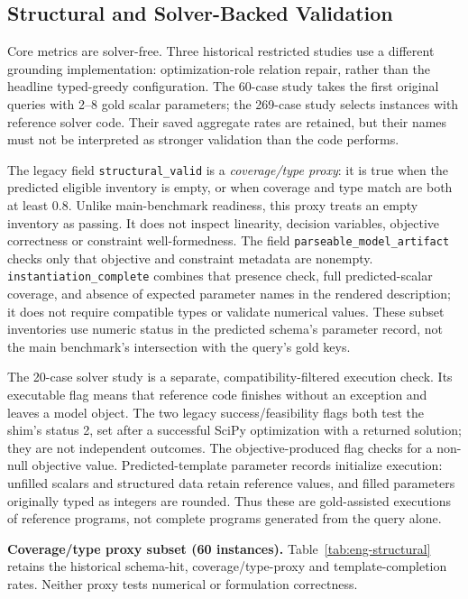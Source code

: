 \subsection{Structural and Solver-Backed Validation}
\label{app:restricted-details}

Core metrics are solver-free. Three historical restricted studies use a different grounding implementation: optimization-role relation repair, rather than the headline typed-greedy configuration. The 60-case study takes the first original queries with 2--8 gold scalar parameters; the 269-case study selects instances with reference solver code. Their saved aggregate rates are retained, but their names must not be interpreted as stronger validation than the code performs.

The legacy field \texttt{structural\_valid} is a \emph{coverage/type proxy}: it is true when the predicted eligible inventory is empty, or when coverage and type match are both at least 0.8. Unlike main-benchmark readiness, this proxy treats an empty inventory as passing. It does not inspect linearity, decision variables, objective correctness or constraint well-formedness. The field \texttt{parseable\_model\_artifact} checks only that objective and constraint metadata are nonempty. \texttt{instantiation\_complete} combines that presence check, full predicted-scalar coverage, and absence of expected parameter names in the rendered description; it does not require compatible types or validate numerical values. These subset inventories use numeric status in the predicted schema's parameter record, not the main benchmark's intersection with the query's gold keys.

The 20-case solver study is a separate, compatibility-filtered execution check. Its executable flag means that reference code finishes without an exception and leaves a model object. The two legacy success/feasibility flags both test the shim's status 2, set after a successful SciPy optimization with a returned solution; they are not independent outcomes. The objective-produced flag checks for a non-null objective value. Predicted-template parameter records initialize execution: unfilled scalars and structured data retain reference values, and filled parameters originally typed as integers are rounded. Thus these are gold-assisted executions of reference programs, not complete programs generated from the query alone.

\medskip\noindent\textbf{Coverage/type proxy subset (60 instances).}
Table~\ref{tab:eng-structural} retains the historical schema-hit, coverage/type-proxy and template-completion rates. Neither proxy tests numerical or formulation correctness.



